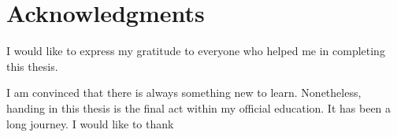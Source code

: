 \chapter*{Acknowledgments}
I would like to express my gratitude to everyone who helped me in completing this thesis.





I am convinced that there is always something new to learn. Nonetheless, handing in this thesis is the final act within my official education. It has been a long journey. I would like to thank